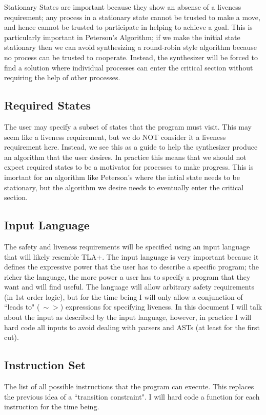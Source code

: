 \documentclass[12pt]{article}
\begin{document}
Stationary States are important because they show an absense of a liveness requirement; any process in a stationary state cannot be trusted to make a move, and hence cannot be trusted to participate in helping to achieve a goal.  This is particularly important in Peterson's Algorithm; if we make the initial state stationary then we can avoid synthesizing a round-robin style algorithm because no process can be trusted to cooperate.  Instead, the synthesizer will be forced to find a solution where individual processes can enter the critical section without requiring the help of other processes.  

\subsection{Required States}
The user may specify a subset of states that the program must visit.  This may seem like a liveness requirement, but we do NOT consider it a liveness requirement here.  Instead, we see this as a guide to help the synthesizer produce an algorithm that the user desires.  In practice this means that we should not expect required states to be a motivator for processes to make progress.  This is imortant for an algorithm like Peterson's where the intial state needs to be stationary, but the algorithm we desire needs to eventually enter the critical section.  

\subsection{Input Language}
The safety and liveness requirements will be specified using an input language that will likely resemble TLA+.  The input language is very important because it defines the expressive power that the user has to describe a specific program; the richer the language, the more power a user has to specify a program that they want and will find useful.  The language will allow arbitrary safety requirements (in 1st order logic), but for the time being I will only allow a conjunction of ``leads to" ($~\sim>$) expressions for specifying liveness.  In this document I will talk about the input as described by the input language, however, in practice I will hard code all inputs to avoid dealing with parsers and ASTs (at least for the first cut).  

\subsection{Instruction Set}
The list of all possible instructions that the program can execute.  This replaces the previous idea of a ``transition constraint".  I will hard code a function for each instruction for the time being.  
\end{document}
